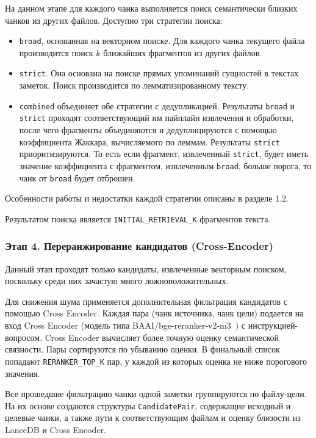 На данном этапе для каждого чанка выполняется поиск семантически близких чанков из других файлов.
Доступно три стратегии поиска:

\begin{itemize}
    \item \texttt{broad}, основанная на векторном поиске.
          Для каждого чанка текущего файла производится поиск $k$ ближайших фрагментов
          из других файлов.
    \item \texttt{strict}.
          Она основана на поиске прямых упоминаний сущностей в текстах заметок.
          Поиск производится по лемматизированному тексту.
    \item \texttt{combined} объединяет обе стратегии с дедупликацией. Результаты
          \texttt{broad} и \texttt{strict} проходят соответствующий им пайплайн извлечения и обработки,
          после чего фрагменты объединяются и дедуплицируются с помощью коэффициента Жаккара,
          вычисляемого по леммам.
          Результаты \texttt{strict} приоритизируются. То есть
          если фрагмент, извлеченный \texttt{strict}, будет иметь значение коэффициента с фрагментом,
          извлеченным \texttt{broad}, больше порога,
          то чанк от \texttt{broad} будет отброшен.
\end{itemize}


Особенности работы и недостатки каждой стратегии описаны в разделе 1.2.

Результатом поиска является \texttt{INITIAL\_RETRIEVAL\_K} фрагментов текста.

\subsubsection*{Этап 4. Переранжирование кандидатов (Cross-Encoder)}
Данный этап проходят только кандидаты, извлеченные векторным поиском,
поскольку среди них зачастую много ложноположительных.

Для снижения шума применяется дополнительная фильтрация кандидатов с помощью Cross Encoder.
Каждая пара (чанк источника, чанк цели) подается на вход Cross Encoder
(модель типа BAAI/bge-reranker-v2-m3~\cite{bge_reranker_v2})
с инструкцией-вопросом.
Cross Encoder вычисляет более точную оценку семантической связности.
Пары сортируются по убыванию оценки. В финальный список попадают \texttt{RERANKER\_TOP\_K} пар,
у каждой из которых оценка не ниже порогового значения.

Все прошедшие фильтрацию чанки одной заметки группируются по файлу-цели.
На их основе создаются структуры \texttt{CandidatePair},
содержащие исходный и целевые чанки, а также пути к соответствующим файлам и оценку близости
из LanceDB и Cross Encoder.

